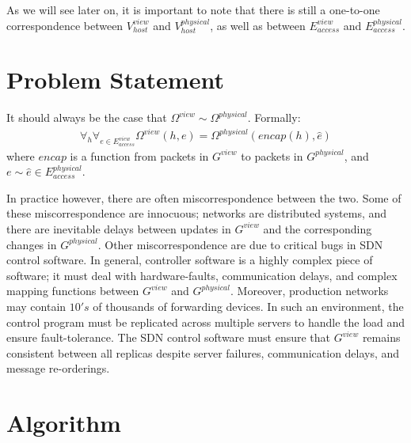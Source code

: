 \documentclass{sig-alternate-10pt}
\begin{document}
As we will see later on, it is important to note that there is still a one-to-one correspondence
between $V_{host}^{view}$ and $V_{host}^{physical}$, as well as between
$E_{access}^{view}$ and $E_{access}^{physical}$.

\section{Problem Statement}

It should always be the case that 
$\Omega^{view} \sim \Omega^{physical}$. Formally:
\begin{align*}
\forall_{h} \forall_{e \in E_{access}^{view}} \Omega^{view}(h,e) =
\Omega^{physical}(encap(h),\hat{e}) 
\end{align*}
where $encap$ is a function from packets in $G^{view}$ to packets in
$G^{physical}$, and $e \sim \hat{e} \in E_{access}^{physical}$.

In practice however, there are often miscorrespondence between the two. Some
of these miscorrespondence are innocuous; networks are distributed systems,
and there are inevitable delays between updates in $G^{view}$ and the
corresponding changes in $G^{physical}$. Other miscorrespondence are
due to critical bugs in SDN control software. In general, controller software
is a
highly complex piece of software; it must deal with hardware-faults,
communication delays, and complex mapping functions  between $G^{view}$ and
$G^{physical}$. Moreover, production networks may contain  $10's$ of thousands of
forwarding devices. In such an environment, the control program must be
replicated across multiple servers to handle the load and ensure
fault-tolerance. The SDN control software must ensure that $G^{view}$ remains consistent
between all replicas despite server failures, communication delays, and
message re-orderings.

\section{Algorithm}
\end{document}
